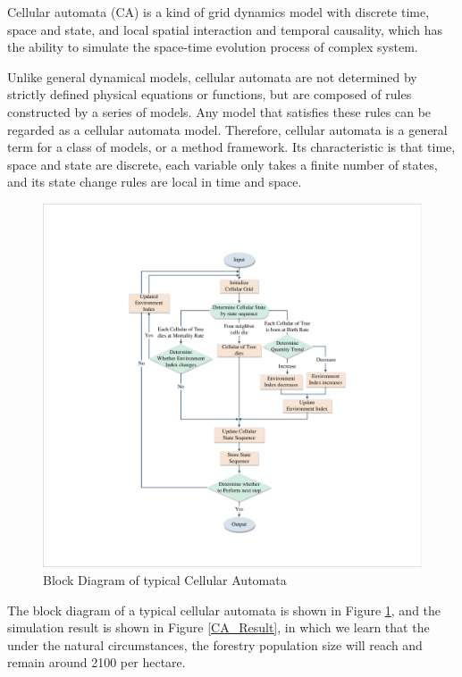 \documentclass{mcmthesis}
\numberwithin{figure}{section}
\numberwithin{table}{section}
\numberwithin{equation}{section}
\begin{document}
Cellular automata (CA) is a kind of grid dynamics model with discrete time, 
space and state, and local spatial interaction and temporal causality, which 
has the ability to simulate the space-time evolution process of complex system.
\par
Unlike general dynamical models, cellular automata are not determined by strictly 
defined physical equations or functions, but are composed of rules constructed by 
a series of models. Any model that satisfies these rules can be regarded as a cellular 
automata model. Therefore, cellular automata is a general term for a class of models, 
or a method framework. Its characteristic is that time, space and state are discrete, 
each variable only takes a finite number of states, and its state change rules are local 
in time and space.
\begin{figure}[htbp]
  \centering
  \includegraphics[width = 12cm]{code&pic/元胞自动机流程图.pdf}
  \caption{Block Diagram of typical Cellular Automata}\label{CA_Fig}
\end{figure}

The block diagram of a typical cellular automata is shown in Figure \ref{CA_Fig}, 
and the simulation result is shown in Figure \ref{CA_Result}, in which
we learn that the under the natural circumstances, the forestry population size
will reach and remain around 2100 per hectare. 
\end{document}
